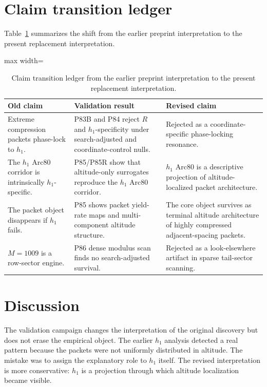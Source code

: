 \documentclass[11pt]{article}
\begin{document}
\section{Claim transition ledger}

Table~\ref{tab:claim-transition} summarizes the shift from the earlier preprint interpretation to the present replacement interpretation.

\begin{table}[H]
\centering
\small
\begin{adjustbox}{max width=\textwidth}
\begin{tabular}{p{}p{}p{}}
\toprule
\textbf{Old claim} & \textbf{Validation result} & \textbf{Revised claim} \\
\midrule
Extreme compression packets phase-lock to \(h_1\). &
P83B and P84 reject \(R\) and \(h_1\)-specificity under search-adjusted and coordinate-control nulls. &
Rejected as a coordinate-specific phase-locking resonance. \\
\midrule
The \(h_1\) Arc80 corridor is intrinsically \(h_1\)-specific. &
P85/P85R show that altitude-only surrogates reproduce the \(h_1\) Arc80 corridor. &
\(h_1\) Arc80 is a descriptive projection of altitude-localized packet architecture. \\
\midrule
The packet object disappears if \(h_1\) fails. &
P85 shows packet yield-rate maps and multi-component altitude structure. &
The core object survives as terminal altitude architecture of highly compressed adjacent-spacing packets. \\
\midrule
\(M=1009\) is a row-sector engine. &
P86 dense modulus scan finds no search-adjusted survival. &
Rejected as a look-elsewhere artifact in sparse tail-sector scanning. \\
\bottomrule
\end{tabular}
\end{adjustbox}
\caption{Claim transition ledger from the earlier preprint interpretation to the present replacement interpretation.}
\label{tab:claim-transition}
\end{table}

\section{Discussion}

The validation campaign changes the interpretation of the original discovery but does not erase the empirical object. The earlier \(h_1\) analysis detected a real pattern because the packets were not uniformly distributed in altitude. The mistake was to assign the explanatory role to \(h_1\) itself. The revised interpretation is more conservative: \(h_1\) is a projection through which altitude localization became visible.
\end{document}
